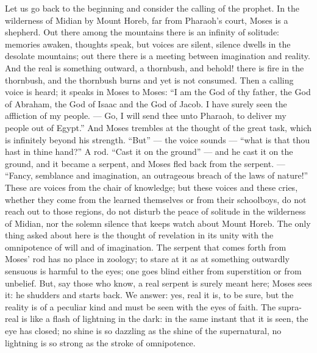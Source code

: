\documentclass[12pt,a4paper,openany]{book}
\newcommand{\opage}[1]{\marginnote{\footnotesize\textit{[#1]}}}
\begin{document}
Let us go back to the beginning and consider the calling of the prophet. In the wilderness of Midian by Mount Horeb, far from Pharaoh's court, Moses is a shepherd. Out there among the mountains there is an infinity of solitude: memories awaken, thoughts speak, but voices are silent, silence dwells in the desolate mountains; out there there is a meeting between imagination and reality. And the real is something outward, a thornbush, and behold! there is fire in the thornbush, and the thornbush burns and yet is not consumed. Then a calling voice is heard; it speaks in Moses to Moses: ``I am the God of thy father, the God of Abraham, the God of Isaac and the God of Jacob. I have surely seen the affliction of my people. --- Go, I will send thee unto Pharaoh, to deliver my people out of Egypt.'' And Moses trembles at the thought of the great task, which is infinitely beyond his strength. ``But'' --- the voice sounds --- ``what is that thou hast in thine hand?'' A rod. ``Cast it on the ground'' --- and he cast it on the ground, and it became a serpent, and Moses fled back from the serpent.
\setcounter{footnote}{0}%
\opage{50}--- ``Fancy, semblance and imagination, an outrageous breach of the laws of nature!'' These are voices from the chair of knowledge; but these voices and these cries, whether they come from the learned themselves or from their schoolboys, do not reach out to those regions, do not disturb the peace of solitude in the wilderness of Midian, nor the solemn silence that keeps watch about Mount Horeb. The only thing asked about here is the thought of revelation in its unity with the omnipotence of will and of imagination. The serpent that comes forth from Moses' rod has no place in zoology; to stare at it as at something outwardly sensuous is harmful to the eyes; one goes blind either from superstition or from unbelief. But, say those who know, a real serpent is surely meant here; Moses sees it: he shudders and starts back. We answer: yes, real it is, to be sure, but the reality is of a peculiar kind and must be seen with the eyes of faith. The supra-real is like a flash of lightning in the dark: in the same instant that it is seen, the eye has closed; no shine is so dazzling as the shine of the supernatural, no lightning is so strong as the stroke of omnipotence.
\end{document}
